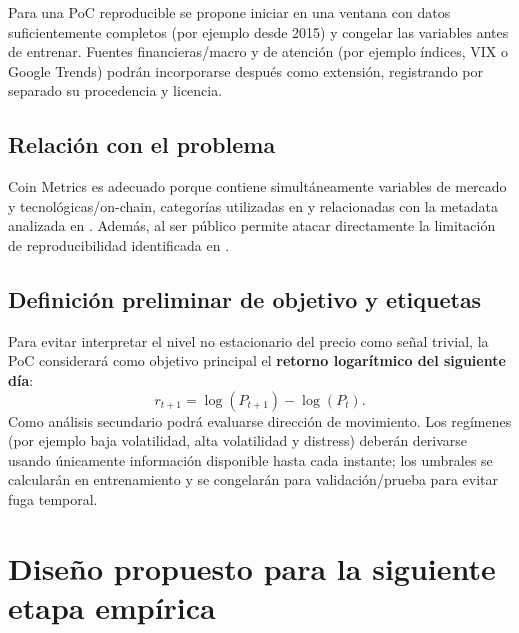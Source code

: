 \documentclass[11pt,letterpaper]{article}
\begin{document}
Para una PoC reproducible se propone iniciar en una ventana con datos suficientemente completos (por ejemplo desde 2015) y congelar las variables antes de entrenar. Fuentes financieras/macro y de atención (por ejemplo índices, VIX o Google Trends) podrán incorporarse después como extensión, registrando por separado su procedencia y licencia.

\subsection{Relación con el problema}
Coin Metrics es adecuado porque contiene simultáneamente variables de mercado y tecnológicas/on-chain, categorías utilizadas en \textcite{carbo2024} y relacionadas con la metadata analizada en \textcite{agakishiev2025}. Además, al ser público permite atacar directamente la limitación de reproducibilidad identificada en \textcite{mizdrakovic2024}.

\subsection{Definición preliminar de objetivo y etiquetas}
Para evitar interpretar el nivel no estacionario del precio como señal trivial, la PoC considerará como objetivo principal el \textbf{retorno logarítmico del siguiente día}:
\[
 r_{t+1}=\log(P_{t+1})-\log(P_t).
\]
Como análisis secundario podrá evaluarse dirección de movimiento. Los regímenes (por ejemplo baja volatilidad, alta volatilidad y distress) deberán derivarse usando únicamente información disponible hasta cada instante; los umbrales se calcularán en entrenamiento y se congelarán para validación/prueba para evitar fuga temporal.

\section{Diseño propuesto para la siguiente etapa empírica}
\end{document}
